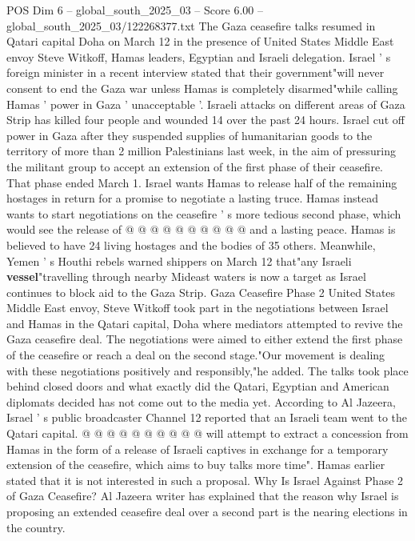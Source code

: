 \begin{textsample}{POS Dim 6 – global\_south\_2025\_03 – Score 6.00 – global\_south\_2025\_03/122268377.txt}  \label{ex:f6_pos_312}
The Gaza ceasefire talks resumed in Qatari capital Doha on March 12 in the presence of United States Middle East envoy Steve Witkoff, Hamas leaders, Egyptian and Israeli delegation.
Israel ' s foreign minister in a recent interview stated that their government"will never consent to end the Gaza war unless Hamas is completely disarmed"while calling Hamas ' power in Gaza ' unacceptable '.
Israeli attacks on different areas of Gaza Strip has killed four people and wounded 14 over the past 24 hours.
Israel cut off power in Gaza after they suspended supplies of humanitarian goods to the territory of more than 2 million Palestinians last week, in the aim of pressuring the militant group to accept an extension of the first phase of their ceasefire.
That phase ended March 1.
Israel wants Hamas to release half of the remaining hostages in return for a promise to negotiate a lasting truce.
Hamas instead wants to start negotiations on the ceasefire ' s more tedious second phase, which would see the release of @ @ @ @ @ @ @ @ @ @ and a lasting peace.
Hamas is believed to have 24 living hostages and the bodies of 35 others.
Meanwhile, Yemen ' s Houthi rebels warned shippers on March 12 that"any Israeli \textbf{vessel}"travelling through nearby Mideast waters is now a target as Israel continues to block aid to the Gaza Strip.
Gaza Ceasefire Phase 2 United States Middle East envoy, Steve Witkoff took part in the negotiations between Israel and Hamas in the Qatari capital, Doha where mediators attempted to revive the Gaza ceasefire deal.
The negotiations were aimed to either extend the first phase of the ceasefire or reach a deal on the second stage."Our movement is dealing with these negotiations positively and responsibly,"he added.
The talks took place behind closed doors and what exactly did the Qatari, Egyptian and American diplomats decided has not come out to the media yet.
According to Al Jazeera, Israel ' s public broadcaster Channel 12 reported that an Israeli team went to the Qatari capital. @ @ @ @ @ @ @ @ @ @ will attempt to extract a concession from Hamas in the form of a release of Israeli captives in exchange for a temporary extension of the ceasefire, which aims to buy talks more time".
Hamas earlier stated that it is not interested in such a proposal.
Why Is Israel Against Phase 2 of Gaza Ceasefire?
Al Jazeera writer has explained that the reason why Israel is proposing an extended ceasefire deal over a second part is the nearing elections in the country.

\end{textsample}
